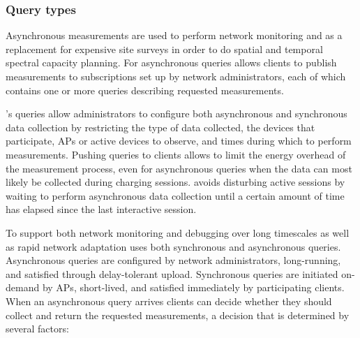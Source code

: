 \subsubsection{Query types}

Asynchronous measurements are used to perform network monitoring and as a
replacement for expensive site surveys in order to do spatial and temporal
spectral capacity planning. For asynchronous queries \PS{} allows clients to
publish measurements to subscriptions set up by network administrators, each
of which contains one or more queries describing requested measurements.

\PS{}'s queries allow administrators to configure both asynchronous and
synchronous data collection by restricting the type of data collected, the
devices that participate, APs or active devices to observe, and times during
which to perform measurements. Pushing queries to clients allows \PS{} to
limit the energy overhead of the measurement process, even for asynchronous
queries when the data can most likely be collected during charging sessions.
\PS{} avoids disturbing active sessions by waiting to perform asynchronous
data collection until a certain amount of time has elapsed since the last
interactive session.

To support both network monitoring and debugging over long timescales as well
as rapid network adaptation \PS{} uses both synchronous and asynchronous
queries. Asynchronous queries are configured by network administrators,
long-running, and satisfied through delay-tolerant upload. Synchronous
queries are initiated on-demand by APs, short-lived, and satisfied
immediately by participating clients. When an asynchronous query arrives
\PS{} clients can decide whether they should collect and return the requested
measurements, a decision that is determined by several factors:

